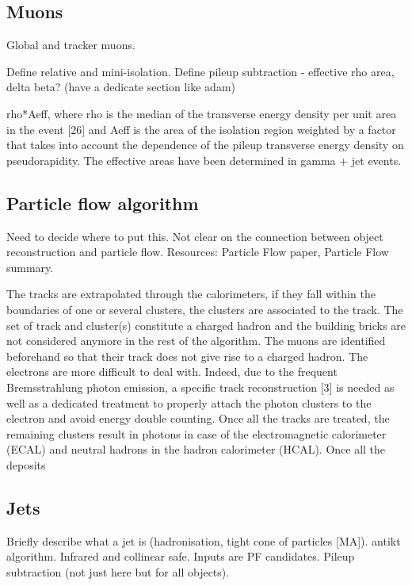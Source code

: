 \subsection{Muons}

Global and tracker muons.

Define relative and mini-isolation.
Define pileup subtraction - effective rho area, delta beta?
(have a dedicate section like adam)

rho*Aeff, where rho is the median of the transverse energy density per unit 
area in 
the event [26] and Aeff is the area of the isolation region weighted by a 
factor that takes into account the dependence of the pileup transverse energy 
density on pseudorapidity. The effective areas have been determined in gamma + 
jet events.

\subsection{Particle flow algorithm}
Need to decide where to put this. Not clear on the connection between object 
reconstruction and particle flow.
Resources: Particle Flow paper, Particle Flow summary.

The tracks are extrapolated through the calorimeters, if they fall within the 
boundaries of one or several clusters, the clusters are associated to the 
track. The set of track and cluster(s) constitute a charged hadron and the 
building bricks are not considered anymore in the rest of the algorithm. The 
muons are identified beforehand so that their track does not give rise to a 
charged hadron. The electrons are more difficult to deal with. Indeed, due to 
the frequent Bremsstrahlung photon emission, a specific track reconstruction [3]
is needed as well as a dedicated treatment to properly attach the photon 
clusters to the electron and avoid energy double counting. Once all the tracks 
are treated, the remaining clusters result in photons in case of the 
electromagnetic calorimeter (ECAL) and neutral hadrons in the hadron 
calorimeter (HCAL). Once all the deposits

\subsection{Jets}

Briefly describe what a jet is (hadronisation, tight cone of particles [MA]).
antikt algorithm. Infrared and collinear safe.
Inputs are PF candidates. Pileup subtraction (not just here but for all 
objects).

